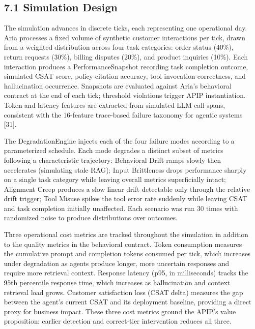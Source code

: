 \subsection{7.1  Simulation Design}

The simulation advances in discrete ticks, each representing one operational day. Aria processes a fixed volume of synthetic customer interactions per tick, drawn from a weighted distribution across four task categories: order status (40\%), return requests (30\%), billing disputes (20\%), and product inquiries (10\%). Each interaction produces a PerformanceSnapshot recording task completion outcome, simulated CSAT score, policy citation accuracy, tool invocation correctness, and hallucination occurrence. Snapshots are evaluated against Aria's behavioral contract at the end of each tick; threshold violations trigger APIP instantiation. Token and latency features are extracted from simulated LLM call spans, consistent with the 16-feature trace-based failure taxonomy for agentic systems [31].

The DegradationEngine injects each of the four failure modes according to a parameterized schedule. Each mode degrades a distinct subset of metrics following a characteristic trajectory: Behavioral Drift ramps slowly then accelerates (simulating stale RAG); Input Brittleness drops performance sharply on a single task category while leaving overall metrics superficially intact; Alignment Creep produces a slow linear drift detectable only through the relative drift trigger; Tool Misuse spikes the tool error rate suddenly while leaving CSAT and task completion initially unaffected. Each scenario was run 30 times with randomized noise to produce distributions over outcomes.

Three operational cost metrics are tracked throughout the simulation in addition to the quality metrics in the behavioral contract. Token consumption measures the cumulative prompt and completion tokens consumed per tick, which increases under degradation as agents produce longer, more uncertain responses and require more retrieval context. Response latency (p95, in milliseconds) tracks the 95th percentile response time, which increases as hallucination and context retrieval load grows. Customer satisfaction loss (CSAT delta) measures the gap between the agent's current CSAT and its deployment baseline, providing a direct proxy for business impact. These three cost metrics ground the APIP's value proposition: earlier detection and correct-tier intervention reduces all three.

